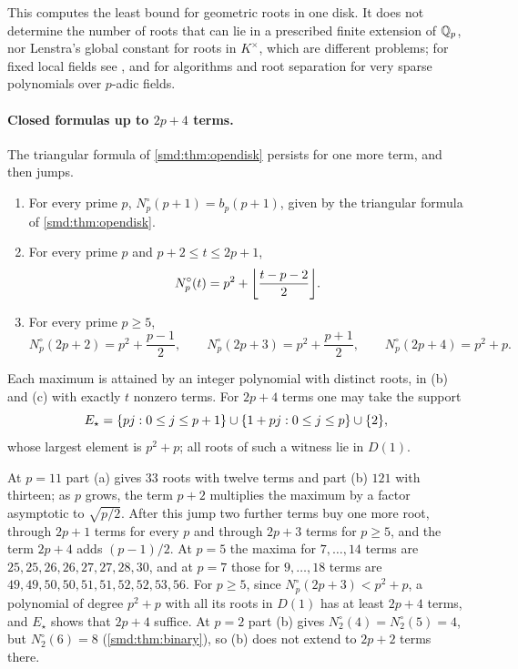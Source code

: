 This computes the least bound for geometric roots in one disk. It does not determine the number
of roots that can lie in a prescribed finite extension of $\mathbb{Q}_p$, nor Lenstra's global constant
for roots in $K^\times$, which are different problems; for fixed local fields see
\cite{Avendano2011Sharp}, and \cite{Rojas2022Root} for algorithms and root separation for very
sparse polynomials over $p$-adic fields.


\paragraph{Closed formulas up to \texorpdfstring{$2p+4$}{2p+4} terms.}
The triangular formula of \cref{smd:thm:opendisk} persists for one more term, and then jumps.

\begin{theorem}\label{smd:thm:jump}
\leavevmode
\begin{enumerate}[label=\textup{(\alph*)}]
\item For every prime $p$, $N^\circ_p(p+1)=b_p(p+1)$, given by the triangular formula of
\cref{smd:thm:opendisk}.
\item For every prime $p$ and $p+2\le t\le2p+1$,
\[
 N^\circ_p(t)=p^2+\floor*{\frac{t-p-2}2} .
\]
\item For every prime $p\ge5$,
\[
 N^\circ_p(2p+2)=p^2+\frac{p-1}2,\qquad N^\circ_p(2p+3)=p^2+\frac{p+1}2,\qquad
 N^\circ_p(2p+4)=p^2+p .
\]
\end{enumerate}
Each maximum is attained by an integer polynomial with distinct roots, in (b) and (c) with
exactly $t$ nonzero terms. For $2p+4$ terms one may take the support
\[
 E_\star=\{pj : 0\le j\le p+1\}\cup\{1+pj : 0\le j\le p\}\cup\{2\},
\]
whose largest element is $p^2+p$; all roots of such a witness lie in $D(1)$.
\end{theorem}

At $p=11$ part (a) gives $33$ roots with twelve terms and part (b) $121$ with thirteen; as $p$
grows, the term $p+2$ multiplies the maximum by a factor asymptotic to $\sqrt{p/2}$. After this
jump two further terms buy one more root, through $2p+1$ terms for every $p$ and through $2p+3$
terms for $p\ge5$, and the term $2p+4$ adds $(p-1)/2$. At $p=5$ the maxima for $7,\dots,14$
terms are $25,25,26,26,27,27,28,30$, and at $p=7$ those for $9,\dots,18$ terms are
$49,49,50,50,51,51,52,52,53,56$. For $p\ge5$, since $N^\circ_p(2p+3)<p^2+p$, a polynomial of degree $p^2+p$
with all its roots in $D(1)$ has at least $2p+4$ terms, and $E_\star$ shows that $2p+4$ suffice.
At $p=2$ part (b) gives $N^\circ_2(4)=N^\circ_2(5)=4$, but $N^\circ_2(6)=8$
(\cref{smd:thm:binary}), so (b) does not extend to $2p+2$ terms there.

